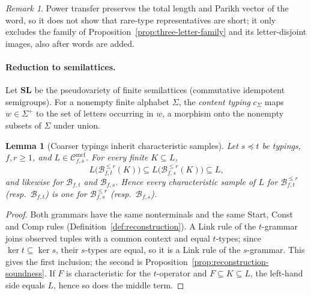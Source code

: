 \documentclass[11pt]{article}
\numberwithin{equation}{section}
\theoremstyle{plain}
\newtheorem{lemma}[theorem]{Lemma}
\theoremstyle{definition}
\theoremstyle{remark}
\newtheorem{remark}[theorem]{Remark}
\newcommand{\Cmcf}[2]{\mathcal{C}^{\mathrm{mcf}}_{#1,#2}}
\theoremstyle{plain}
\begin{document}
\begin{remark}
Power transfer preserves the total length and Parikh vector of the word, so it
does not show that rare-type representatives are short; it only excludes the
family of Proposition~\ref{prop:three-letter-family} and its letter-disjoint images,
also after words are added.
\end{remark}

\paragraph{Reduction to semilattices.}
Let $\mathbf{SL}$ be the pseudovariety of finite semilattices (commutative
idempotent semigroups).  For a nonempty finite alphabet $\Sigma$, the
\emph{content typing} $c_\Sigma$ maps $w\in\Sigma^+$ to the set of letters
occurring in $w$, a morphism onto the nonempty subsets of $\Sigma$ under union.

\begin{lemma}[Coarser typings inherit characteristic samples]
\label{lem:typing-monotone}
Let $s\preceq t$ be typings, $f,r\ge1$, and $L\in\Cmcf{f}{s}$.  For every
finite $K\subseteq L$,
\[
 L\bigl(\mathcal B^{\le r}_{f,t}(K)\bigr)\subseteq
 L\bigl(\mathcal B^{\le r}_{f,s}(K)\bigr)\subseteq L,
\]
and likewise for $\mathcal B_{f,t}$ and $\mathcal B_{f,s}$.  Hence every
characteristic sample of $L$ for $\mathcal B^{\le r}_{f,t}$ (resp.\
$\mathcal B_{f,t}$) is one for $\mathcal B^{\le r}_{f,s}$ (resp.\
$\mathcal B_{f,s}$).
\end{lemma}

\begin{proof}
Both grammars have the same nonterminals and the same Start, Const and Comp
rules (Definition~\ref{def:reconstruction}).  A Link rule of the $t$-grammar
joins observed tuples with a common context and equal $t$-types; since
$\ker t\subseteq\ker s$, their $s$-types are equal, so it is a Link rule of the
$s$-grammar.  This gives the first inclusion; the second is
Proposition~\ref{prop:reconstruction-soundness}.  If $F$ is characteristic for
the $t$-operator and $F\subseteq K\subseteq L$, the left-hand side equals $L$,
hence so does the middle term.
\end{proof}
\end{document}
